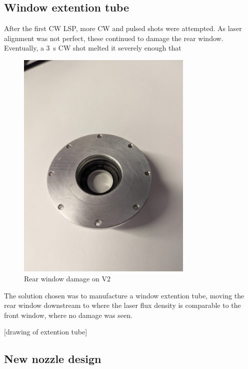         \subsection{Window extention tube}
            
            After the first CW LSP, more CW and pulsed shots were attempted. As laser alignment was not perfect, these continued to damage the rear window. Eventually, a \qty{3}{s} CW shot melted it severely enough that 

            \begin{figure}
                \centering
                \includegraphics[width=0.75\textwidth]{assets/5 results/window damage.jpg}
                \caption{Rear window damage on V2}
            \end{figure}

            The solution chosen was to manufacture a window extention tube, moving the rear window downstream to where the laser flux density is comparable to the front window, where no damage was seen.

            [drawing of extention tube]

        \subsection{New nozzle design}
            
